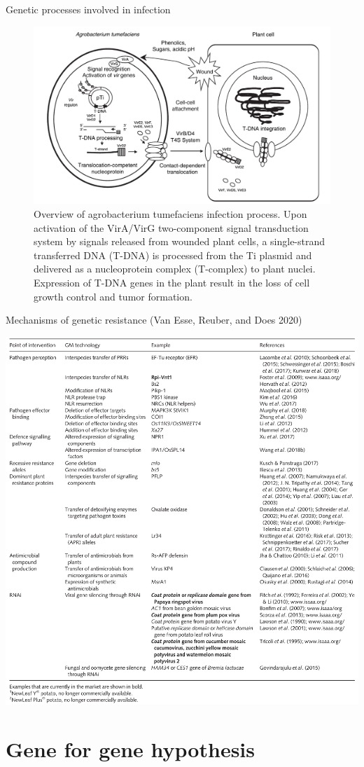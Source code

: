 \documentclass[11pt,dvipsnames,ignorenonframetext,aspectratio=169]{beamer}
\begin{document}
\begin{frame}{Genetic processes involved in infection}
\protect\hypertarget{genetic-processes-involved-in-infection}{}
\begin{figure}

{\centering \includegraphics[width=0.66\linewidth]{../images/agrobacterium-transformation} 

}

\caption{Overview of agrobacterium tumefaciens infection process. Upon activation of the VirA/VirG two-component signal transduction system by signals released from wounded plant cells, a single-strand transferred DNA (T-DNA) is processed from the Ti plasmid and delivered as a nucleoprotein complex (T-complex) to plant nuclei. Expression of T-DNA genes in the plant result in the loss of cell growth control and tumor formation.}\label{fig:mechanism-of-infection}
\end{figure}
\end{frame}

\begin{frame}{Mechanisms of genetic resistance (Van Esse, Reuber, and
Does 2020)}
\protect\hypertarget{mechanisms-of-genetic-resistance-van2020genetic}{}
\begin{center}\includegraphics[width=0.4\linewidth]{../images/genetic_solution_pathogens} \end{center}
\end{frame}

\hypertarget{gene-for-gene-hypothesis}{%
\section{Gene for gene hypothesis}\label{gene-for-gene-hypothesis}}
\end{document}
